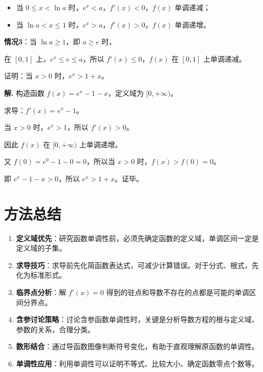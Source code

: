 \documentclass[11pt]{ctexrep}
\begin{document}
\begin{itemize}
    \item 当 $0 \le x < \ln a$ 时，$e^x < a$，$f'(x) < 0$，$f(x)$ 单调递减；
    \item 当 $\ln a < x \le 1$ 时，$e^x > a$，$f'(x) > 0$，$f(x)$ 单调递增。
\end{itemize}

\textbf{情况3}：当 $\ln a \ge 1$，即 $a \ge e$ 时，

在 $[0, 1]$ 上，$e^x \le e \le a$，所以 $f'(x) \le 0$，$f(x)$ 在 $[0, 1]$ 上单调递减。

\begin{example}[利用单调性证明不等式]
    证明：当 $x > 0$ 时，$e^x > 1 + x$。
\end{example}

\textbf{解.} 构造函数 $f(x) = e^x - 1 - x$，定义域为 $[0, +\infty)$。

求导：$f'(x) = e^x - 1$。

当 $x > 0$ 时，$e^x > 1$，所以 $f'(x) > 0$。

因此 $f(x)$ 在 $[0, +\infty)$ 上单调递增。

又 $f(0) = e^0 - 1 - 0 = 0$，所以当 $x > 0$ 时，$f(x) > f(0) = 0$。

即 $e^x - 1 - x > 0$，所以 $e^x > 1 + x$。证毕。

\section*{方法总结}

\begin{enumerate}
    \item \textbf{定义域优先}：研究函数单调性前，必须先确定函数的定义域，单调区间一定是定义域的子集。
    \item \textbf{求导技巧}：求导前先化简函数表达式，可减少计算错误。对于分式、根式，先化为标准形式。
    \item \textbf{临界点分析}：解 $f'(x) = 0$ 得到的驻点和导数不存在的点都是可能的单调区间分界点。
    \item \textbf{含参讨论策略}：讨论含参函数单调性时，关键是分析导数方程的根与定义域、参数的关系，合理分类。
    \item \textbf{数形结合}：通过导函数图像判断符号变化，有助于直观理解原函数的单调性。
    \item \textbf{单调性应用}：利用单调性可以证明不等式、比较大小、确定函数零点个数等。
\end{enumerate}
\end{document}
